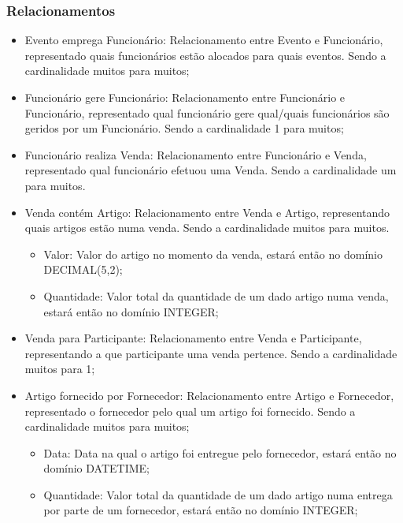 \documentclass[a4paper,12pt]{scrreprt}
\begin{document}
             \subsubsection{Relacionamentos}
             \begin{itemize}
                 \item{Evento emprega Funcionário:} Relacionamento entre Evento e Funcionário, representado quais funcionários estão alocados para quais eventos. Sendo a cardinalidade muitos para muitos;
                 \item{Funcionário gere Funcionário:} Relacionamento entre Funcionário e Funcionário, representado qual funcionário gere qual/quais funcionários são geridos por um Funcionário. Sendo a cardinalidade 1 para muitos;
                 \item{Funcionário realiza Venda:} Relacionamento entre Funcionário e Venda, representado qual funcionário efetuou uma Venda. Sendo a cardinalidade um para muitos.
                 \item{Venda contém Artigo:} Relacionamento entre Venda e Artigo, representando quais artigos estão numa venda. Sendo a cardinalidade muitos para muitos.
                     \begin{itemize}
                     \item{Valor:} Valor do artigo no momento da venda, estará então no domínio DECIMAL(5,2);
                       
                     \item{Quantidade:} Valor total da quantidade de um dado artigo numa venda, estará então no domínio INTEGER;
                       
                     \end{itemize}
                 \item{Venda para Participante:} Relacionamento entre Venda e Participante, representando a que participante uma venda pertence. Sendo a cardinalidade muitos para 1;
                 \item{Artigo fornecido por Fornecedor:} Relacionamento entre Artigo e Fornecedor, representado o fornecedor pelo qual um artigo foi fornecido. Sendo a cardinalidade muitos para muitos;
                     \begin{itemize}
                     \item{Data:} Data na qual o artigo foi entregue pelo fornecedor, estará então no domínio DATETIME;
                     \item{Quantidade:} Valor total da quantidade de um dado artigo numa entrega por parte de um fornecedor, estará então no domínio INTEGER;
                       

\end{itemize}
\end{itemize}
\end{document}
